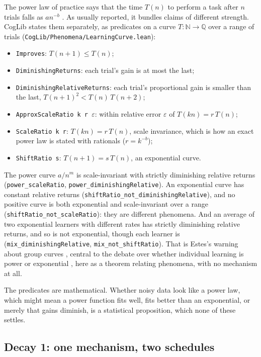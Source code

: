 \documentclass[11pt]{article}
\newcommand{\code}[1]{\texttt{#1}}
\newcommand{\lean}[1]{\texttt{#1}}
\begin{document}
The power law of practice says that the time $T(n)$ to perform a task after $n$ trials falls as $a n^{-b}$ \citep{newell1981}. As usually reported, it bundles claims of different strength. CogLib states them separately, as predicates on a curve $T : \mathbb{N} \to \mathbb{Q}$ over a range of trials (\code{CogLib/Phenomena/LearningCurve.lean}):
\begin{itemize}
  \item \lean{Improves}: $T(n+1) \le T(n)$;
  \item \lean{DiminishingReturns}: each trial's gain is at most the last;
  \item \lean{DiminishingRelativeReturns}: each trial's proportional gain is smaller than the last, $T(n+1)^2 < T(n)\,T(n+2)$;
  \item \lean{ApproxScaleRatio~k~r~$\varepsilon$}: within relative error $\varepsilon$ of $T(kn) = r\,T(n)$;
  \item \lean{ScaleRatio~k~r}: $T(kn) = r\,T(n)$, scale invariance, which is how an exact power law is stated with rationals ($r = k^{-b}$);
  \item \lean{ShiftRatio~s}: $T(n+1) = s\,T(n)$, an exponential curve.
\end{itemize}
The power curve $a/n^m$ is scale-invariant with strictly diminishing relative returns (\lean{power\_scaleRatio}, \lean{power\_diminishingRelative}). An exponential curve has constant relative returns (\lean{shiftRatio\_not\_diminishingRelative}), and no positive curve is both exponential and scale-invariant over a range (\lean{shiftRatio\_not\_scaleRatio}): they are different phenomena. And an average of two exponential learners with different rates has strictly diminishing relative returns, and so is not exponential, though each learner is (\lean{mix\_diminishingRelative}, \lean{mix\_not\_shiftRatio}). That is Estes's warning about group curves \citep{estes1956}, central to the debate over whether individual learning is power or exponential \citep{heathcote2000}, here as a theorem relating phenomena, with no mechanism at all.

The predicates are mathematical. Whether noisy data look like a power law, which might mean a power function fits well, fits better than an exponential, or merely that gains diminish, is a statistical proposition, which none of these settles.

\subsection{Decay 1: one mechanism, two schedules}
\label{sec:decay1}
\end{document}
